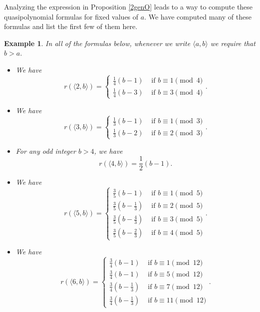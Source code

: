\documentclass[12pt]{amsart}
\theoremstyle{plain}\newtheorem{proposition}{Proposition}[section]
\newtheorem{example}[proposition]{Example}
\begin{document}
Analyzing the expression in Proposition \ref{2genO} leads to a way to compute these quasipolynomial formulas for fixed values of $a$.  We have computed many of these formulas and list the first few of them here.
\begin{example}
In all of the formulas below, whenever we write $\langle a,b\rangle$ we require that $b>a$.
\begin{itemize}
\item We have 
\[
r(\langle 2,b\rangle) = \begin{cases}
\frac{1}{4} (b-1) & \text{ if } b \equiv 1 \pmod{4} \\
\frac{1}{4} (b-3) & \text{ if } b \equiv 3 \pmod{4}
\end{cases}.
\]

\item We have 
\[
r(\langle 3,b\rangle) = \begin{cases}
\frac{1}{3} (b-1) & \text{ if } b \equiv 1 \pmod{3} \\
\frac{1}{3} (b-2) & \text{ if } b \equiv 2 \pmod{3}
\end{cases}.
\]

\item For any odd integer $b > 4$, we have 
\[
r(\langle 4,b\rangle) = \frac{1}{2} (b-1).
\]

\item We have 
\[
r(\langle 5,b\rangle) = \begin{cases}
\frac{3}{5} (b-1) & \text{ if } b \equiv 1 \pmod{5} \\
\frac{3}{5} \left(b-\frac{1}{3}\right) & \text{ if } b \equiv 2 \pmod{5} \\
\frac{3}{5} \left(b-\frac{4}{3}\right)  & \text{ if } b \equiv 3 \pmod{5} \\
\frac{3}{5} \left(b-\frac{2}{3}\right) & \text{ if } b \equiv 4 \pmod{5} 
\end{cases}.
\]

\item We have 
\[
r(\langle 6,b\rangle) = \begin{cases}
\frac{3}{4} (b-1) & \text{ if } b \equiv 1 \pmod{12} \\
\frac{3}{4}  (b-1) & \text{ if } b \equiv 5 \pmod{12} \\
\frac{3}{4} \left(b-\frac{1}{3}\right) & \text{ if } b \equiv 7 \pmod{12} \\
\frac{3}{4} \left(b-\frac{1}{3}\right) & \text{ if } b \equiv 11 \pmod{12} 
\end{cases}.
\]

\end{itemize}
\end{example}
\end{document}
